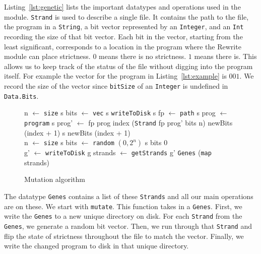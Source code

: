 \documentclass[preprint,nocopyrightspace]{sigplanconf}
\begin{document}
Listing~\ref{lst:genetic} lists the important datatypes and operations used in the module. \lstinline!Strand! is used to describe a single file. It contains the path to the file, the program in a \lstinline!String!, a bit vector represented by an \lstinline!Integer!, and an \lstinline!Int! recording the size of that bit vector. Each bit in the vector, starting from the least significant, corresponds to a location in the program where the Rewrite module can place strictness. $0$ means there is no strictness. $1$ means there is. This allows us to keep track of the status of the file without digging into the program itself. For example the vector for the program in Listing~\ref{lst:example} is $001$. We record the size of the vector since \lstinline!bitSize! of an \lstinline!Integer! is undefined in \lstinline!Data.Bits!.

\begin{figure}[t]
\begin{algorithmic}
\State n $\gets$ \lstinline!size! s
\State bits $\gets$ \lstinline!vec! s
    \Return \lstinline!writeToDisk! s
    \State fp $\gets$ \lstinline{path} s
    \State prog $\gets$ \lstinline{program} s
    \State prog' $\gets$  {fp prog index}
    \State \Return {} {(\lstinline!Strand! fp prog' bits n) newBits (index + 1)}
\Else 
\State\Return{} {s newBits (index + 1)}
\EndIf
\EndFunction\\
\State n $\gets$ \lstinline!size! s
\State bits $\gets$ \lstinline!random! $(0, 2^n)$
\State\Return{} {s bits 0}
\EndFunction\\
\State g' $\gets$ \lstinline!writeToDisk! g
\State strands $\gets$ \lstinline!getStrands! g'
\State\Return \lstinline!Genes! (\lstinline!map!  strands)
\EndFunction
\end{algorithmic}
\caption{Mutation algorithm}
\label{alg:mutate}
\end{figure}

The datatype \lstinline!Genes! contains a list of these \lstinline!Strands! and all our main operations are on these. We start with \lstinline!mutate!. This function takes in a \lstinline!Genes!. First, we write the \lstinline!Genes! to a new unique directory on disk. For each \lstinline!Strand! from the \lstinline!Genes!, we generate a random bit vector. Then, we run through that \lstinline!Strand! and flip the state of strictness throughout the file to match the vector. Finally, we write the changed program to disk in that unique directory.
\end{document}
